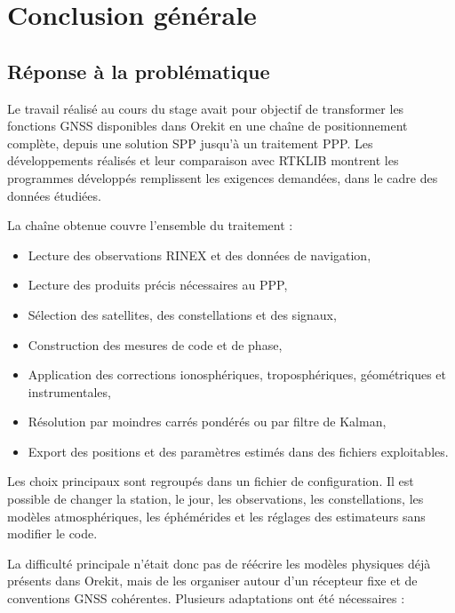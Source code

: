 
\chapter{Conclusion générale}
\label{conclusion}

\section{Réponse à la problématique}

Le travail réalisé au cours du stage
avait pour objectif de transformer les fonctions GNSS disponibles
dans Orekit en une chaîne de positionnement complète, depuis une solution SPP
jusqu'à un traitement PPP. Les développements réalisés et leur comparaison avec
RTKLIB montrent les programmes développés remplissent les exigences demandées, dans le cadre des données étudiées.

La chaîne obtenue couvre l'ensemble du traitement :

\begin{itemize}
    \item Lecture des observations RINEX et des données de navigation,
    \item Lecture des produits précis nécessaires au PPP,
    \item Sélection des satellites, des constellations et des signaux,
    \item Construction des mesures de code et de phase,
    \item Application des corrections ionosphériques, troposphériques,
    géométriques et instrumentales,
    \item Résolution par moindres carrés pondérés ou par filtre de Kalman,
    \item Export des positions et des paramètres estimés dans des fichiers
    exploitables.
\end{itemize}

Les choix principaux sont regroupés dans un fichier de configuration. Il est
possible de changer la station, le jour, les observations, les
constellations, les modèles atmosphériques, les éphémérides et les réglages des
estimateurs sans modifier le code.

La difficulté principale n'était donc pas de réécrire les modèles physiques
déjà présents dans Orekit, mais de les organiser autour d'un récepteur fixe et
de conventions GNSS cohérentes. Plusieurs adaptations ont été nécessaires :

